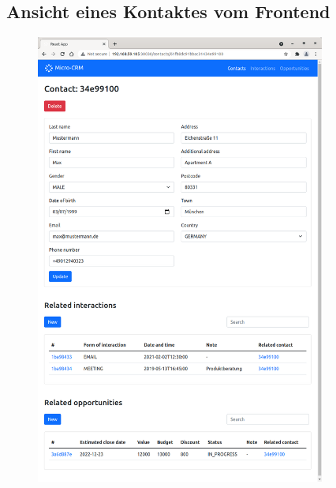 \clearpage
\subsection*{Ansicht eines Kontaktes vom Frontend}

\begin{figure}[H] 
    \centering
    \includegraphics[width=0.85\textwidth]{figures/FrontendKontakt.png}
\end{figure}

\clearpage
